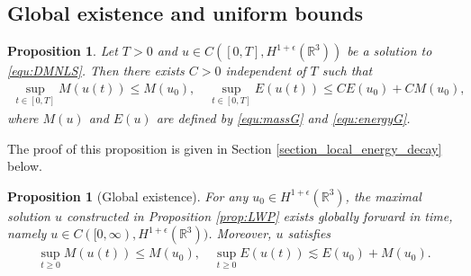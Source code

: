 \documentclass[10pt%
]{amsart}
\numberwithin{equation}{section}
\newcommand{\R}{\mathbb{R}}
\newtheorem{proposition}[theorem]{Proposition}
\theoremstyle{definition}
\begin{document}

\subsection{Global existence and uniform bounds}

\begin{proposition}%
	\label{proposition_uniform}
	Let $T>0$ and $u\in C([0,T],H^{1+\epsilon}(\R^3))$ be a solution to \eqref{equ:DMNLS}. Then there exists $C>0$ independent of $T$ such that 
	\begin{align}
		\label{equ:uniformenergy}
		\sup_{t\in [0,T]}M(u(t))\le M(u_0),\quad \sup_{t\in [0,T]}E(u(t))\le C E(u_0)+CM(u_0),
	\end{align}
	where $M(u)$ and $E(u)$ are defined by \eqref{equ:massG} and \eqref{equ:energyG}. 
\end{proposition}

The proof of this proposition is given in Section \ref{section_local_energy_decay} below.

\begin{proposition}[Global existence]\label{prop:CGT}
	For any $u_0\in H^{1+\epsilon}(\R^3)$, the maximal solution $u$ constructed in Proposition \ref{prop:LWP} exists globally forward in time, namely $u\in C([0,\infty),H^{1+\epsilon}(\R^3))$. Moreover, $u$ satisfies
	\begin{align}
		\label{equ:uniformenergy_2}
		\sup_{t\ge0}M(u(t))\le M(u_0),\quad \sup_{t\ge0}E(u(t))\lesssim E(u_0)+M(u_0).
	\end{align}
\end{proposition}
\end{document}
